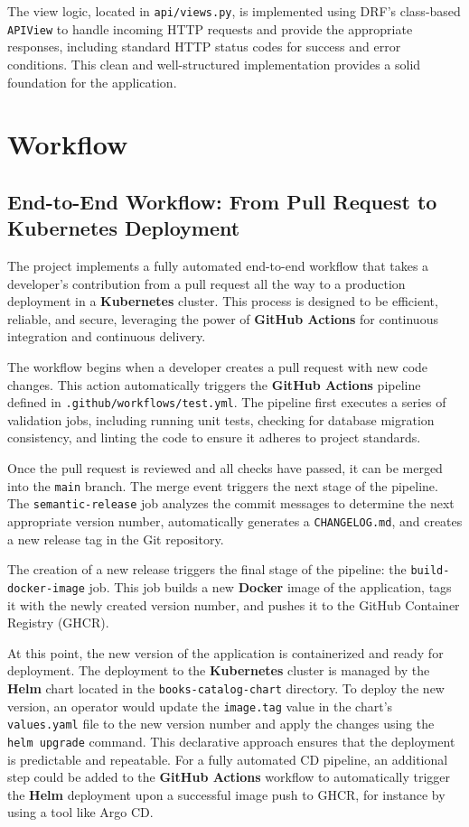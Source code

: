 \documentclass{article}
\begin{document}
The view logic, located in \texttt{api/views.py}, is implemented using DRF's class-based \texttt{APIView} to handle incoming HTTP requests and provide the appropriate responses, including standard HTTP status codes for success and error conditions. This clean and well-structured implementation provides a solid foundation for the application.

\section{Workflow}

\subsection{End-to-End Workflow: From Pull Request to Kubernetes Deployment}

The project implements a fully automated end-to-end workflow that takes a developer's contribution from a pull request all the way to a production deployment in a \textbf{Kubernetes} cluster. This process is designed to be efficient, reliable, and secure, leveraging the power of \textbf{GitHub Actions} for continuous integration and continuous delivery.

The workflow begins when a developer creates a pull request with new code changes. This action automatically triggers the \textbf{GitHub Actions} pipeline defined in \texttt{.github/workflows/test.yml}. The pipeline first executes a series of validation jobs, including running unit tests, checking for database migration consistency, and linting the code to ensure it adheres to project standards.

Once the pull request is reviewed and all checks have passed, it can be merged into the \texttt{main} branch. The merge event triggers the next stage of the pipeline. The \texttt{semantic-release} job analyzes the commit messages to determine the next appropriate version number, automatically generates a \texttt{CHANGELOG.md}, and creates a new release tag in the Git repository.

The creation of a new release triggers the final stage of the pipeline: the \texttt{build-docker-image} job. This job builds a new \textbf{Docker} image of the application, tags it with the newly created version number, and pushes it to the GitHub Container Registry (GHCR).

At this point, the new version of the application is containerized and ready for deployment. The deployment to the \textbf{Kubernetes} cluster is managed by the \textbf{Helm} chart located in the \texttt{books-catalog-chart} directory. To deploy the new version, an operator would update the \texttt{image.tag} value in the chart's \texttt{values.yaml} file to the new version number and apply the changes using the \texttt{helm upgrade} command. This declarative approach ensures that the deployment is predictable and repeatable. For a fully automated CD pipeline, an additional step could be added to the \textbf{GitHub Actions} workflow to automatically trigger the \textbf{Helm} deployment upon a successful image push to GHCR, for instance by using a tool like Argo CD.
\end{document}
